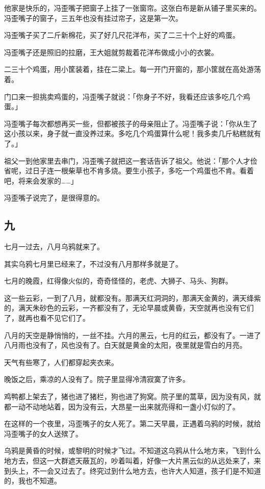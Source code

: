 \documentclass[UTF8]{ctexart}
\begin{document}
他家是快乐的，冯歪嘴子把窗子上挂了一张窗帘。这张白布是新从铺子里买来的。冯歪嘴子的窗子，三五年也没有挂过帘子，这是第一次。

冯歪嘴子买了二斤新棉花，买了好几尺花洋布，买了二三十个上好的鸡蛋。

冯歪嘴子还是照旧的拉磨，王大姐就剪裁着花洋布做成小小的衣裳。

二三十个鸡蛋，用小筐装着，挂在二梁上。每一开门开窗的，那小筐就在高处游荡着。

门口来一担挑卖鸡蛋的，冯歪嘴子就说：「你身子不好，我看还应该多吃几个鸡蛋。」

冯歪嘴子每次都想再买一些，但都被孩子的母亲阻止了。冯歪嘴子说：「你从生了这小孩以来，身子就一直没养过来。多吃几个鸡蛋算什么呢！我多卖几斤粘糕就有了。」

祖父一到他家里去串门，冯歪嘴子就把这一套话告诉了祖父。他说：「那个人才俭省呢，过日子连一根柴草也不肯多烧。要生小孩子，多吃一个鸡蛋也不肯。看着吧，将来会发家的……」

冯歪嘴子说完了，是很得意的。

\subsection{九}

七月一过去，八月乌鸦就来了。

其实乌鸦七月里已经来了，不过没有八月那样多就是了。

七月的晚霞，红得像火似的，奇奇怪怪的，老虎、大狮子、马头、狗群。

这一些云彩，一到了八月，就都没有。那满天红洞洞的，那满天金黄的，满天绛紫的，满天朱砂色的云彩，一齐都没有了，无论早晨或黄昏，天空就再也没有它们了，就再也看不见它们了。

八月的天空是静悄悄的，一丝不挂。六月的黑云，七月的红云，都没有了。一进了八月雨也没有了，风也没有了。白天就是黄金的太阳，夜里就是雪白的月亮。

天气有些寒了，人们都穿起夹衣来。

晚饭之后，乘凉的人没有了。院子里显得冷清寂寞了许多。

鸡鸭都上架去了，猪也进了猪栏，狗也进了狗窝。院子里的蒿草，因为没有风，就都一动不动地站着，因为没有云，大昂星一出来就亮得和一盏小灯似的了。

在这样的一个夜里，冯歪嘴子的女人死了。第二天早晨，正遇着乌鸦的时候，就给冯歪嘴子的女人送殡了。

乌鸦是黄昏的时候，或黎明的时候才飞过。不知道这乌鸦从什么地方来，飞到什么地方去，但这一大群遮天蔽瓦的，吵着叫着，好像一大片黑云似的从远处来了，来到头上，不一会又过去了。终究过到什么地方去，也许大人知道，孩子们是不知道的，我也不知道。
\end{document}
